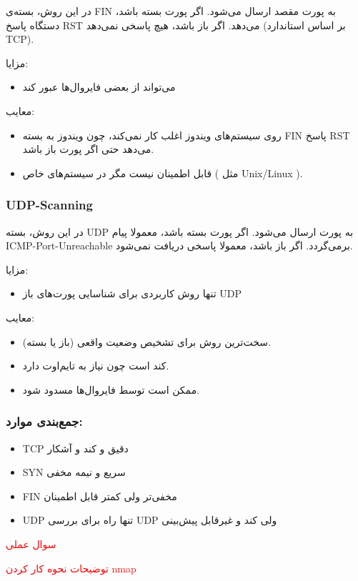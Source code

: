 در این روش، بسته‌ی FIN به پورت مقصد ارسال می‌شود. اگر پورت بسته باشد، دستگاه پاسخ RST می‌دهد. اگر باز باشد، هیچ پاسخی نمی‌دهد (بر اساس استاندارد TCP).

مزایا:

\begin{itemize}
    \item می‌تواند از بعضی فایروال‌ها عبور کند
\end{itemize}

معایب:

\begin{itemize}
    \item روی سیستم‌های ویندوز اغلب کار نمی‌کند، چون ویندوز به بسته FIN پاسخ RST می‌دهد حتی اگر پورت باز باشد.
    \item قابل اطمینان نیست مگر در سیستم‌های خاص ( مثل Unix/Linux ).
\end{itemize}


\subsubsection*{UDP-Scanning}

در این روش، بسته UDP به پورت ارسال می‌شود. اگر پورت بسته باشد، معمولا پیام ICMP-Port-Unreachable برمی‌گردد. اگر باز باشد، معمولا پاسخی دریافت نمی‌شود.

مزایا:

\begin{itemize}
    \item تنها روش کاربردی برای شناسایی پورت‌های باز UDP
\end{itemize}

معایب:

\begin{itemize}
    \item سخت‌ترین روش برای تشخیص وضعیت واقعی (باز یا بسته).
    \item کند است چون نیاز به تایم‌اوت دارد.
    \item ممکن است توسط فایروال‌ها مسدود شود.
\end{itemize}


\subsubsection*{جمع‌بندی موارد:}

\begin{itemize}
    \item TCP
    دقیق و کند و آشکار
    \item SYN
    سریع و نیمه مخفی
    \item FIN
    مخفی‌تر ولی کمتر قابل اطمینان
    \item UDP
    تنها راه برای بررسی UDP ولی کند و غیرقابل پیش‌بینی
\end{itemize}



\textcolor{red}{سوال عملی}

\textcolor{red}{توضیحات نحوه کار کردن nmap}